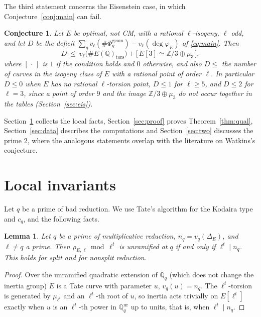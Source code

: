 \documentclass[11pt]{amsart}
\newtheorem{conjecture}[theorem]{Conjecture}
\newtheorem{lemma}[theorem]{Lemma}
\theoremstyle{definition}
\newcommand{\Q}{\mathbb{Q}}
\newcommand{\Z}{\mathbb{Z}}
\newcommand{\degphi}{\deg\varphi_E}
\newcommand{\Phig}{\Phi^{\mathrm{geom}}}
\begin{document}
The third statement concerns the Eisenstein case, in which Conjecture~\ref{conj:main} can fail.

\begin{conjecture}\label{conj:eis}
Let $E$ be optimal, not CM, with a rational $\ell$-isogeny, $\ell$ odd, and let $D$ be the deficit $\sum_q v_\ell(\#\Phig_q)-v_\ell(\degphi)$ of \eqref{eq:main}. Then
\[
D\ \le\ v_\ell\bigl(\#E(\Q)_{\mathrm{tors}}\bigr)+\bigl[\,E[3]\simeq\Z/3\oplus\mu_3\,\bigr],
\]
where $[\,\cdot\,]$ is $1$ if the condition holds and $0$ otherwise, and also $D\le$ the number of curves in the isogeny class of $E$ with a rational point of order $\ell$. In particular $D\le0$ when $E$ has no rational $\ell$-torsion point, $D\le1$ for $\ell\ge5$, and $D\le2$ for $\ell=3$, since a point of order $9$ and the image $\Z/3\oplus\mu_3$ do not occur together in the tables (Section~\ref{sec:eis}).
\end{conjecture}

Section~\ref{sec:local} collects the local facts, Section~\ref{sec:proof} proves Theorem~\ref{thm:qual}, Section~\ref{sec:data} describes the computations and Section~\ref{sec:two} discusses the prime $2$, where the analogous statements overlap with the literature on Watkins's conjecture.

\section{Local invariants}\label{sec:local}

Let $q$ be a prime of bad reduction. We use Tate's algorithm \cite[IV.9]{SilvermanATAEC} for the Kodaira type and $c_q$, and the following facts.

\begin{lemma}\label{lem:tamagawa-exp}
Let $q$ be a prime of multiplicative reduction, $n_q=v_q(\Delta_E)$, and $\ell\ne q$ a prime. Then $\rho_{E,\ell}\bmod\ell^t$ is unramified at $q$ if and only if $\ell^t\mid n_q$. This holds for split and for nonsplit reduction.
\end{lemma}

\begin{proof}
Over the unramified quadratic extension of $\Q_q$ (which does not change the inertia group) $E$ is a Tate curve with parameter $u$, $v_q(u)=n_q$. The $\ell^t$-torsion is generated by $\mu_{\ell^t}$ and an $\ell^t$-th root of $u$, so inertia acts trivially on $E[\ell^t]$ exactly when $u$ is an $\ell^t$-th power in $\Q_q^{\mathrm{ur}}$ up to units, that is, when $\ell^t\mid n_q$.
\end{proof}
\end{document}
